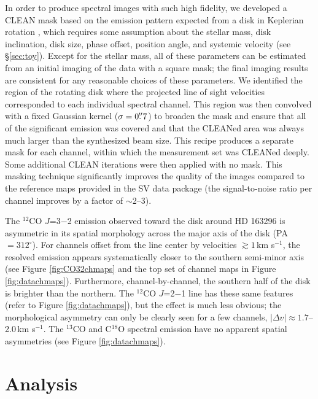 In order to produce spectral images with such high fidelity, we developed a 
CLEAN mask based on the emission pattern expected from a disk in Keplerian 
rotation \citep{beckwith93}, which requires some assumption about the stellar 
mass, disk inclination, disk size, phase offset, position angle, and systemic 
velocity (see \S\ref{sec:toy}).  Except for the stellar mass, all of these
parameters can be estimated from an initial imaging of the data with a square 
mask; the final imaging results are consistent for any reasonable choices of 
these parameters.  We identified the region of the rotating disk where the 
projected line of sight velocities corresponded to each individual spectral 
channel.  This region was then convolved with a fixed Gaussian kernel 
($\sigma = 0\mbox{$.\!\!^{\prime\prime}$}7$) to broaden the mask and ensure that all of the significant
emission was covered and that the CLEANed area was always much larger than the 
synthesized beam size.  This recipe produces a separate mask for each channel, 
within which the measurement set was CLEANed deeply.  Some additional CLEAN 
iterations were then applied with no mask.  This masking technique significantly
improves the quality of the images compared to the reference maps provided in 
the SV data package (the signal-to-noise ratio per channel improves by a factor 
of $\sim$2--3).

The $^{12}$CO $J$=3$-$2 emission observed toward the disk around HD 163296 is 
asymmetric in its spatial morphology across the major axis of the disk 
(PA$=312^\circ$).  For channels offset from the line center by velocities 
$\gtrsim 1$\,km s$^{-1}$, the resolved emission appears systematically closer 
to the southern semi-minor axis (see Figure \ref{fig:CO32chmaps} and the top set
of channel maps in Figure \ref{fig:datachmaps}).  Furthermore, 
channel-by-channel, the southern half of the disk is brighter than the northern.
The $^{12}$CO $J$=2$-$1 line has these same features (refer to Figure 
\ref{fig:datachmaps}), but the effect is much less obvious; the morphological 
asymmetry can only be clearly seen for a few channels, 
$|\Delta v| \approx 1.7$--2.0\,km s$^{-1}$.  The $^{13}$CO and C$^{18}$O 
spectral emission have no apparent spatial asymmetries (see Figure 
\ref{fig:datachmaps}).

\section{Analysis}\label{sec:analysis}

